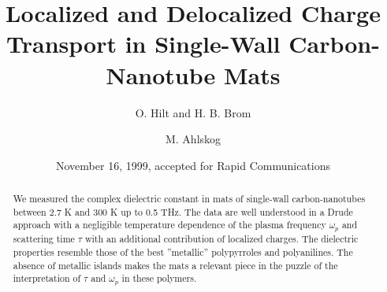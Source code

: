 
\draft

\title{Localized and Delocalized Charge Transport in Single-Wall
Carbon-Nanotube Mats}
\author{O. Hilt and H. B. Brom}
\address{
Kamerlingh Onnes Laboratory, Leiden University, P.O. Box 9504,
2300 RA Leiden, The Netherlands}
\author{M. Ahlskog}
\address{
Low Temperature Laboratory, Helsinki University of Technology,
FIN-02015 HUT, Finland}

\date{November 16, 1999, accepted for Rapid Communications}
\maketitle

\begin{abstract}
We measured the complex dielectric constant in mats of single-wall
carbon-nanotubes between 2.7 K and 300 K up to 0.5 THz.  The data are well
understood in a Drude approach with a negligible temperature dependence of
the plasma frequency $\omega_p$ and scattering time $\tau$ with an additional
contribution of localized charges.  The dielectric properties resemble those
of the best ''metallic'' polypyrroles and polyanilines. The absence of
metallic islands makes the mats a relevant piece in the puzzle of the
interpretation of $\tau$ and $\omega_p$ in these polymers.
\end{abstract}


